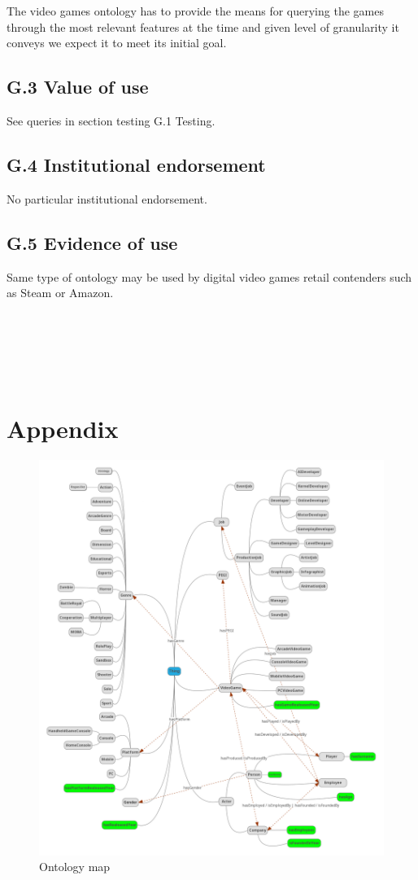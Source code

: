 \documentclass{article}
\begin{document}
The video games ontology has to provide the means for querying the games through the most relevant features at the time and given level of granularity it conveys we expect it to meet its initial goal. 

\subsection*{G.3 Value of use}

See queries in section testing G.1 Testing.
\subsection*{G.4 Institutional endorsement}
No particular institutional endorsement. 
\subsection*{G.5 Evidence of use}
Same type of ontology may be used by digital video games retail contenders such as Steam or Amazon. 
\\
\\
\\
\\
\\
\\


\section*{Appendix}

\begin{figure}[h]  
\centering
  \includegraphics[scale=0.45]{ontologieV2}
   \caption{Ontology map}
\end{figure}
\end{document}
